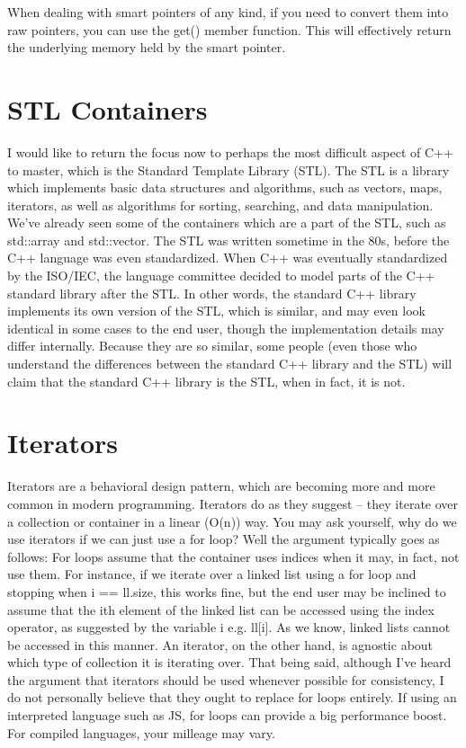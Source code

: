 \documentclass{article}
\begin{document}
When dealing with smart pointers of any kind, if you need to convert them into raw pointers, you can use the
get() member function. This will effectively return the underlying memory held by the smart pointer.

\section{STL Containers}

I would like to return the focus now to perhaps the most difficult aspect of C++ to master, which is the
Standard Template Library (STL). The STL is a library which implements basic data structures and algorithms,
such as vectors, maps, iterators, as well as algorithms for sorting, searching, and data manipulation. We’ve
already seen some of the containers which are a part of the STL, such as std::array and std::vector. The STL
was written sometime in the 80s, before the C++ language was even standardized. When C++ was eventually
standardized by the ISO/IEC, the language committee decided to model parts of the C++ standard library after
the STL. In other words, the standard C++ library implements its own version of the STL, which is similar,
and may even look identical in some cases to the end user, though the implementation details may differ
internally. Because they are so similar, some people (even those who understand the differences between the
standard C++ library and the STL) will claim that the standard C++ library is the STL, when in fact, it is not.

\section{Iterators}

Iterators are a behavioral design pattern, which are becoming more and more common in modern programming.
Iterators do as they suggest – they iterate over a collection or container in a linear (O(n)) way. You may
ask yourself, why do we use iterators if we can just use a for loop? Well the argument typically goes as
follows: For loops assume that the container uses indices when it may, in fact, not use them. For instance,
if we iterate over a linked list using a for loop and stopping when i == ll.size, this works fine, but the
end user may be inclined to assume that the ith element of the linked list can be accessed using the index
operator, as suggested by the variable i e.g. ll[i]. As we know, linked lists cannot be accessed in this
manner. An iterator, on the other hand, is agnostic about which type of collection it is iterating over. That
being said, although I’ve heard the argument that iterators should be used whenever possible for consistency,
I do not personally believe that they ought to replace for loops entirely. If using an interpreted language
such as JS, for loops can provide a big performance boost. For compiled languages, your milleage may vary.
\end{document}
